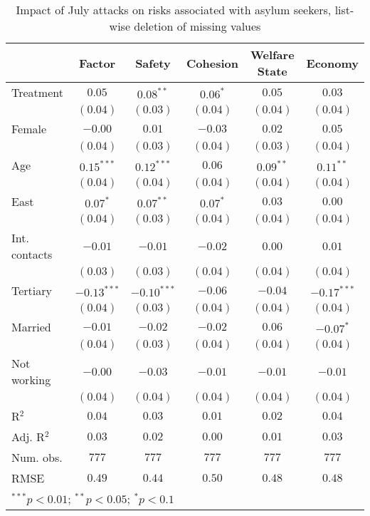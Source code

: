 
\begin{table}
\caption{Impact of July attacks on risks associated with asylum seekers, list-wise deletion of missing values}
\begin{center}
\begin{tabular}{l c c c c c}
\toprule
 & Factor & Safety & Cohesion & Welfare State & Economy \\
\midrule
Treatment     & $0.05$        & $0.08^{**}$   & $0.06^{*}$ & $0.05$      & $0.03$        \\
              & $(0.04)$      & $(0.03)$      & $(0.04)$   & $(0.04)$    & $(0.04)$      \\
Female        & $-0.00$       & $0.01$        & $-0.03$    & $0.02$      & $0.05$        \\
              & $(0.04)$      & $(0.03)$      & $(0.04)$   & $(0.03)$    & $(0.04)$      \\
Age           & $0.15^{***}$  & $0.12^{***}$  & $0.06$     & $0.09^{**}$ & $0.11^{**}$   \\
              & $(0.04)$      & $(0.04)$      & $(0.04)$   & $(0.04)$    & $(0.04)$      \\
East          & $0.07^{*}$    & $0.07^{**}$   & $0.07^{*}$ & $0.03$      & $0.00$        \\
              & $(0.04)$      & $(0.03)$      & $(0.04)$   & $(0.04)$    & $(0.04)$      \\
Int. contacts & $-0.01$       & $-0.01$       & $-0.02$    & $0.00$      & $0.01$        \\
              & $(0.03)$      & $(0.03)$      & $(0.04)$   & $(0.04)$    & $(0.04)$      \\
Tertiary      & $-0.13^{***}$ & $-0.10^{***}$ & $-0.06$    & $-0.04$     & $-0.17^{***}$ \\
              & $(0.04)$      & $(0.03)$      & $(0.04)$   & $(0.04)$    & $(0.04)$      \\
Married       & $-0.01$       & $-0.02$       & $-0.02$    & $0.06$      & $-0.07^{*}$   \\
              & $(0.04)$      & $(0.03)$      & $(0.04)$   & $(0.04)$    & $(0.04)$      \\
Not working   & $-0.00$       & $-0.03$       & $-0.01$    & $-0.01$     & $-0.01$       \\
              & $(0.04)$      & $(0.04)$      & $(0.04)$   & $(0.04)$    & $(0.04)$      \\
\midrule
R$^2$         & $0.04$        & $0.03$        & $0.01$     & $0.02$      & $0.04$        \\
Adj. R$^2$    & $0.03$        & $0.02$        & $0.00$     & $0.01$      & $0.03$        \\
Num. obs.     & $777$         & $777$         & $777$      & $777$       & $777$         \\
RMSE          & $0.49$        & $0.44$        & $0.50$     & $0.48$      & $0.48$        \\
\bottomrule
\multicolumn{6}{l}{\scriptsize{$^{***}p<0.01$; $^{**}p<0.05$; $^{*}p<0.1$}}
\end{tabular}
\label{tab_risk_na}
\end{center}
\end{table}
